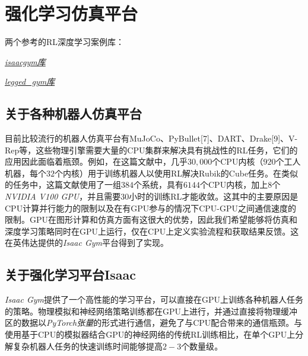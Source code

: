 
\chapter[强化学习仿真平台]{\label{section:rl_simulate_plateform}强化学习仿真平台}
\begin{note}
  两个参考的RL深度学习案例库：

  \emph{\href{https://github.com/DaojiePENG}{isaacgym库}}

  \emph{\href{https://github.com/DaojiePENG}{legged\_gym库}}
\end{note}

\section[关于各种机器人仿真平台]{关于各种机器人仿真平台}
目前比较流行的机器人仿真平台有MuJoCo\cite[p]{Todorov_Erez_Tassa_2012}、PyBullet[7]、DART\cite[p]{Lee_X_Grey_Ha_Kunz_Jain_Ye_S_Srinivasa_Stilman_Karen_Liu_2018}、Drake[9]、V-Rep\cite[p]{Rohmer_Singh_Freese_2013}等，这些物理引擎需要大量的CPU集群来解决具有挑战性的RL任务，它们的应用因此面临着瓶颈。例如，在这篇文献\cite[p]{OpenAI_Akkaya_Andrychowicz_Chociej_Litwin_McGrew_Petron_Paino_Plappert_Powell_et_al_2019}中，几乎$30,000$个CPU内核（$920$个工人机器，每个$32$个内核）用于训练机器人以使用RL解决Rubik的Cube任务。在类似的任务中，这篇文献\cite[p]{Andrychowicz_Baker_Chociej_Józefowicz_McGrew_Pachocki_Petron_Plappert_Powell_Ray_et_al_2020}使用了一组$384$个系统，具有$6144$个CPU内核，加上$8$个\emph{NVIDIA V100 GPU}，并且需要$30$小时的训练RL才能收敛。这其中的主要原因是CPU计算并行能力的限制以及在有GPU参与的情况下CPU-GPU之间通信速度的限制。GPU在图形计算和仿真方面有这很大的优势，因此我们希望能够将仿真和深度学习策略同时在GPU上运行，仅在CPU上定义实验流程和获取结果反馈。这在英伟达提供的\emph{Isaac Gym}平台得到了实现。


\section[强化学习平台Isaac]{\label{section:isaac_gym}关于强化学习平台Isaac\cite[p4-10]{Makoviychuk_Wawrzyniak_Guo_Lu_Storey_Macklin_Hoeller_Rudin_Allshire_Handa_et_al_2021}}


\emph{Isaac Gym}提供了一个高性能的学习平台，可以直接在GPU上训练各种机器人任务的策略。物理模拟和神经网络策略训练都在GPU上进行，并通过直接将物理缓冲区的数据以\emph{PyTorch张量}的形式进行通信，避免了与CPU配合带来的通信瓶颈。与使用基于CPU的模拟器结合GPU的神经网络的传统RL训练相比，在单个GPU上分解复杂机器人任务的快速训练时间能够提高$2-3$个数量级\cite[p1]{Makoviychuk_Wawrzyniak_Guo_Lu_Storey_Macklin_Hoeller_Rudin_Allshire_Handa_et_al_2021}。


